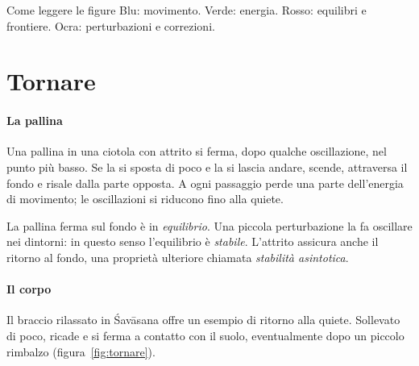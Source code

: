 \documentclass[11pt,a4paper,twoside=false,headinclude,footinclude]{scrartcl}
\begin{document}
\begin{riquadro}{Come leggere le figure}
Blu: movimento. Verde: energia. Rosso: equilibri e frontiere. Ocra: perturbazioni e correzioni.
\end{riquadro}

\section{Tornare}\label{sec:tornare}

\paragraph{La pallina} Una pallina in una ciotola con attrito si ferma, dopo qualche oscillazione, nel punto più basso. Se la si sposta di poco e la si lascia andare, scende, attraversa il fondo e risale dalla parte opposta. A ogni passaggio perde una parte dell'energia di movimento; le oscillazioni si riducono fino alla quiete.

La pallina ferma sul fondo è in \emph{equilibrio}. Una piccola perturbazione la fa oscillare nei dintorni: in questo senso l'equilibrio è \emph{stabile}. L'attrito assicura anche il ritorno al fondo, una proprietà ulteriore chiamata \emph{stabilità asintotica}.

\paragraph{Il corpo} Il braccio rilassato in Śavāsana offre un esempio di ritorno alla quiete. Sollevato di poco, ricade e si ferma a contatto con il suolo, eventualmente dopo un piccolo rimbalzo (figura~\ref{fig:tornare}).
\end{document}
